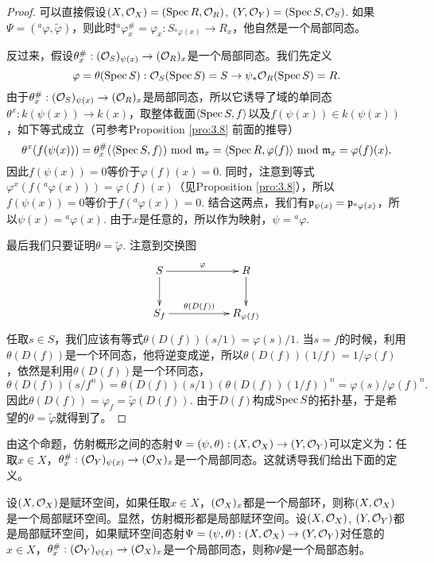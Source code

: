 \begin{proof}
可以直接假设$(X,\mathcal{O}_X)=(\operatorname{Spec} R,\mathcal{O}_R)$, $(Y,\mathcal{O}_Y)=(\operatorname{Spec} S,\mathcal{O}_S)$. 如果$\Psi=({}^a\varphi,\widetilde{\varphi})$，则此时${}^a\varphi^\#_x=\varphi_x:S_{{}^a\varphi(x)}\to R_x$，他自然是一个局部同态。

反过来，假设$\theta_x^\#:(\mathcal{O}_S)_{\psi(x)}\to (\mathcal{O}_R)_x$是一个局部同态。我们先定义
\[
	\varphi=\theta(\operatorname{Spec} S):\mathcal{O}_S(\operatorname{Spec} S)=S\to \psi_*\mathcal{O}_R(\operatorname{Spec} S)=R.
\]
由于$\theta_x^\#:(\mathcal{O}_S)_{\psi(x)}\to (\mathcal{O}_R)_x$是局部同态，所以它诱导了域的单同态$\theta^x:k(\psi(x))\to k(x)$，取整体截面$\langle \operatorname{Spec} S,f\rangle$以及$f(\psi(x))\in k(\psi(x))$，如下等式成立（可参考Proposition \ref{pro:3.8} 前面的推导）
\[
	\theta^x(f(\psi(x)))=\theta_x^\#(\langle \operatorname{Spec} S,f\rangle)\,\, \text{mod}\,\, \mathfrak{m}_x=\langle \operatorname{Spec} R,\varphi(f)\rangle \,\, \text{mod}\,\, \mathfrak{m}_x = \varphi(f)(x).
\]
因此$f(\psi(x))=0$等价于$\varphi(f)(x)=0$. 同时，注意到等式$\varphi^x(f({}^a\varphi(x)))=\varphi(f)(x)$（见Proposition \ref{pro:3.8}），所以$f(\psi(x))=0$等价于$f({}^a\varphi(x))=0$. 结合这两点，我们有$\mathfrak{p}_{\psi(x)}=\mathfrak{p}_{{}^a\varphi(x)}$，所以$\psi(x)={}^a\varphi(x)$. 由于$x$是任意的，所以作为映射，$\psi={}^a\varphi$.

最后我们只要证明$\theta=\widetilde{\varphi}$. 注意到交换图
\[
	\xymatrix{
	S\ar[d]\ar[rr]^-{\varphi}&&R\ar[d]\\
	S_{f}\ar[rr]^-{\theta(D(f))}&&R_{\varphi(f)}
	}
\]
任取$s\in S$，我们应该有等式$\theta(D(f))(s/1)=\varphi(s)/1$. 当$s=f$的时候，利用$\theta(D(f))$是一个环同态，他将逆变成逆，所以$\theta(D(f))(1/f)=1/\varphi(f)$，依然是利用$\theta(D(f))$是一个环同态，
\[
	\theta(D(f))(s/f^n)=\theta(D(f))(s/1)(\theta(D(f))(1/f))^n=\varphi(s)/\varphi(f)^n.
\]
因此$\theta(D(f))=\varphi_f=\widetilde{\varphi}(D(f))$. 由于$D(f)$构成$\operatorname{Spec} S$的拓扑基，于是希望的$\theta=\widetilde{\varphi}$就得到了。
\end{proof}

由这个命题，仿射概形之间的态射$\Psi=(\psi,\theta):(X,\mathcal{O}_X)\to (Y,\mathcal{O}_Y)$可以定义为：任取$x\in X$，$\theta_x^\#:(\mathcal{O}_Y)_{\psi(x)}\to (\mathcal{O}_X)_x$是一个局部同态。这就诱导我们给出下面的定义。

\begin{para}
设$(X,\mathcal{O}_X)$是赋环空间，如果任取$x\in X$，$(\mathcal{O}_X)_x$都是一个局部环，则称$(X,\mathcal{O}_X)$是一个局部赋环空间。显然，仿射概形都是局部赋环空间。设$(X,\mathcal{O}_X)$, $(Y,\mathcal{O}_Y)$都是局部赋环空间，如果赋环空间态射$\Psi=(\psi,\theta):(X,\mathcal{O}_X)\to (Y,\mathcal{O}_Y)$对任意的$x\in X$，$\theta_x^\#:(\mathcal{O}_Y)_{\psi(x)}\to (\mathcal{O}_X)_x$是一个局部同态，则称$\Psi$是一个局部态射。
\end{para}

